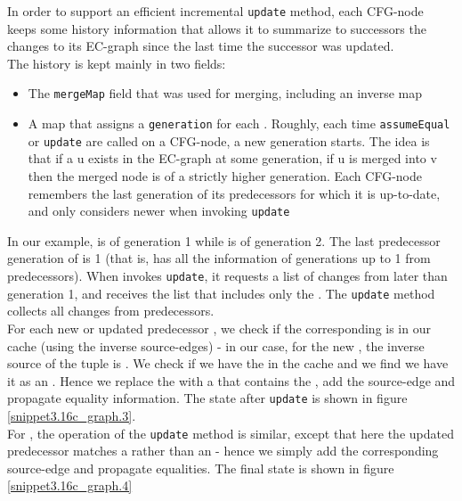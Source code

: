 \bigskip
\noindent
In order to support an efficient incremental \lstinline|update| method, each CFG-node keeps some history information that allows it to summarize to successors the changes to its EC-graph since the last time the successor was updated.\\
The history is kept mainly in two fields:
\begin{itemize}
	\item The \lstinline|mergeMap| field that was used for merging, including an inverse map
	\item A map that assigns a \lstinline|generation| for each \GT{}. Roughly, each time \lstinline|assumeEqual| or \lstinline|update| are called on a CFG-node, a new generation starts. The idea is that if a \GT{} u exists in the EC-graph at some generation, if u is merged into v then the merged node is of a strictly higher generation. 
	Each CFG-node remembers the last generation of its predecessors for which it is up-to-date, and only considers newer \GTs{} when invoking \lstinline|update|
\end{itemize}

\noindent
In our example,  is of generation 1 while  is of generation 2. The last predecessor generation of  is 1 (that is,  has all the information of generations up to 1 from predecessors). When  invokes \lstinline|update|, it requests a list of changes from  later than generation 1, and receives the list that includes only the \GT{} \m{[f(b)_0]}.
The \lstinline|update| method collects all changes from predecessors.\\
For each new or updated predecessor \GT{}, we check if the corresponding \GT{} is in our cache (using the inverse source-edges) - in our case, for the new \GT{} , the inverse source of the tuple  is . We check if we have the \GFA{}  in the cache and we find we have it as an \RGFA{}. Hence we replace the \RGFA{} with a \GT{} that contains the \GFA{} , add the source-edge and propagate equality information. The state after \lstinline|update| is shown in figure \ref{snippet3.16c_graph.3}.\\
For , the operation of the \lstinline|update| method is similar, except that here the updated predecessor \GT{} matches a \GT{} rather than an \RGFA{} - hence we simply add the corresponding source-edge and propagate equalities. The final state is shown in figure \ref{snippet3.16c_graph.4}

